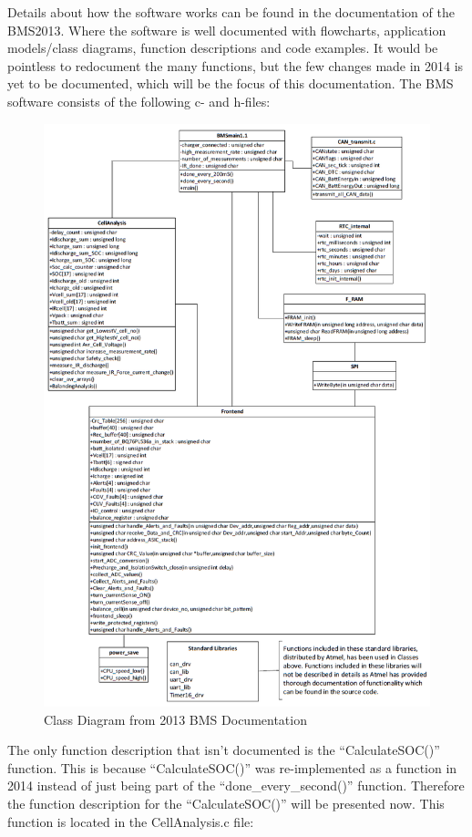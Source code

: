 Details about how the software works can be found in the documentation of the BMS2013. Where the software is well documented with flowcharts, application models/class diagrams, function descriptions and code examples. It would be pointless to redocument the many functions, but the few changes made in 2014 is yet to be documented, which will be the focus of this documentation.
The BMS software consists of the following c- and h-files:\\
\begin{figure}[H]
	\centering
	\includegraphics[width=1.0\linewidth]{Software/BMS-ClassDiagram.PNG}
	\caption{Class Diagram from 2013 BMS Documentation}
	\label{fig:SOFTWARE_BMS}
\end{figure}
The only function description that isn’t documented is the “CalculateSOC()” function. This is because “CalculateSOC()” was re-implemented as a function in 2014 instead of just being part of the “done\_every\_second()” function. Therefore the function description for the “CalculateSOC()” will be presented now. This function is located in the CellAnalysis.c file:
